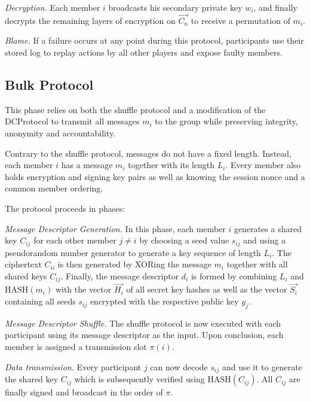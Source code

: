 \emph{Decryption.}
      Each member $i$ broadcasts his secondary private key $w_i$, and finally decrypts the remaining
      layers of encryption on $\vec{C_n}$ to receive a permutation of $m_i$.
      
\emph{Blame.}
      If a failure occurs at any point during this protocol, participants use their stored
      log to replay actions by all other players and expose faulty members.

\subsection{Bulk Protocol}

This phase relies on both the shuffle protocol and a modification of the \ac{DCProtocol}
to transmit all messages $m_i$ to the group while preserving integrity, anonymity and accountability.

Contrary to the shuffle protocol, messages do not have a fixed length. Instead, each member
$i$ has a message $m_i$ together with its length $L_i$. Every member also holds encryption and
signing key pairs as well as knowing the session nonce and a common member ordering.

The protocol proceeds in phases:

\emph{Message Descriptor Generation.}
      In this phase, each member $i$ generates a shared key $C_{ij}$ for each other member $j \neq i$
      by choosing a seed value $s_{ij}$ and using a pseudorandom number generator \cite{stinson2006cryptography} to generate a
      key sequence of length $L_i$. The ciphertext $C_{ii}$ is then generated by
      XORing the message $m_i$ together with all shared keys $C_{ij}$. Finally, the message descriptor
      $d_i$ is formed by combining $L_i$ and $\text{HASH}(m_i)$ with the vector $\vec{H_i}$ of all secret key
      hashes as well as the vector $\vec{S_i}$ containing all seeds $s_{ij}$ encrypted with the respective
      public key $y_j$.

\emph{Message Descriptor Shuffle.}
      The shuffle protocol is now executed with each participant using its message descriptor
      as the input. Upon conclusion, each member is assigned a transmission slot $\pi(i)$.

\emph{Data transmission.}
      Every participant $j$ can now decode $s_{ij}$ and use it to generate the shared key $C_{ij}$ which
      is subsequently verified using $\text{HASH}(C_{ij})$. All $C_{ij}$ are finally signed and
      broadcast in the order of $\pi$.
      
